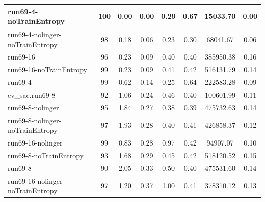 \begin{table}
\begin{longtable}{|l|c|c|c|c|c|c|c|}
run69-4-noTrainEntropy & 100 & {\cellcolor[HTML]{EBF2F0}} \color[HTML]{000000} 0.00 & {\cellcolor[HTML]{EBF2F0}} \color[HTML]{000000} 0.00 & {\cellcolor[HTML]{DFECE9}} \color[HTML]{000000} 0.29 & 0.67 & 15033.70 & 0.00 \\ \hline
run69-4-nolinger-noTrainEntropy & 98 & {\cellcolor[HTML]{EBF2F0}} \color[HTML]{000000} 0.18 & {\cellcolor[HTML]{EBF2F0}} \color[HTML]{000000} 0.06 & {\cellcolor[HTML]{EBF2F0}} \color[HTML]{000000} 0.23 & 0.30 & 68041.67 & 0.06 \\ \hline
run69-16 & 96 & {\cellcolor[HTML]{EBF2F0}} \color[HTML]{000000} 0.23 & {\cellcolor[HTML]{EBF2F0}} \color[HTML]{000000} 0.09 & {\cellcolor[HTML]{C9E2DC}} \color[HTML]{000000} 0.40 & 0.40 & 385950.38 & 0.16 \\ \hline
run69-16-noTrainEntropy & 99 & {\cellcolor[HTML]{EBF2F0}} \color[HTML]{000000} 0.23 & {\cellcolor[HTML]{EBF2F0}} \color[HTML]{000000} 0.09 & {\cellcolor[HTML]{C7E1DB}} \color[HTML]{000000} 0.41 & 0.42 & 516131.79 & 0.14 \\ \hline
run69-4 & 99 & {\cellcolor[HTML]{CBE3DD}} \color[HTML]{000000} 0.62 & {\cellcolor[HTML]{EBF2F0}} \color[HTML]{000000} 0.14 & {\cellcolor[HTML]{E6F0EE}} \color[HTML]{000000} 0.25 & 0.64 & 222583.28 & 0.09 \\ \hline
ev_sac.run69-8 & 92 & {\cellcolor[HTML]{A7D1C9}} \color[HTML]{000000} 1.06 & {\cellcolor[HTML]{D8E9E5}} \color[HTML]{000000} 0.24 & {\cellcolor[HTML]{BEDCD6}} \color[HTML]{000000} 0.46 & 0.40 & 100601.99 & 0.11 \\ \hline
run69-8-nolinger & 95 & {\cellcolor[HTML]{66B2A3}} \color[HTML]{F1F1F1} 1.84 & {\cellcolor[HTML]{BFDDD7}} \color[HTML]{000000} 0.27 & {\cellcolor[HTML]{CDE4DF}} \color[HTML]{000000} 0.38 & 0.39 & 475732.63 & 0.14 \\ \hline
run69-8-nolinger-noTrainEntropy & 97 & {\cellcolor[HTML]{5FAF9F}} \color[HTML]{F1F1F1} 1.93 & {\cellcolor[HTML]{B2D7CF}} \color[HTML]{000000} 0.28 & {\cellcolor[HTML]{CAE2DD}} \color[HTML]{000000} 0.40 & 0.41 & 426858.37 & 0.12 \\ \hline
run69-16-nolinger & 99 & {\cellcolor[HTML]{BADAD4}} \color[HTML]{000000} 0.83 & {\cellcolor[HTML]{ADD4CC}} \color[HTML]{000000} 0.28 & {\cellcolor[HTML]{5AAC9C}} \color[HTML]{F1F1F1} 0.97 & 0.42 & 94907.07 & 0.10 \\ \hline
run69-8-noTrainEntropy & 93 & {\cellcolor[HTML]{73B8AA}} \color[HTML]{000000} 1.68 & {\cellcolor[HTML]{A7D1C9}} \color[HTML]{000000} 0.29 & {\cellcolor[HTML]{C0DDD7}} \color[HTML]{000000} 0.45 & 0.42 & 518120.52 & 0.15 \\ \hline
run69-8 & 90 & {\cellcolor[HTML]{55AA99}} \color[HTML]{F1F1F1} 2.05 & {\cellcolor[HTML]{7ABCAF}} \color[HTML]{000000} 0.33 & {\cellcolor[HTML]{B6D8D1}} \color[HTML]{000000} 0.50 & 0.40 & 475531.60 & 0.14 \\ \hline
run69-16-nolinger-noTrainEntropy & 97 & {\cellcolor[HTML]{9ACBC1}} \color[HTML]{000000} 1.20 & {\cellcolor[HTML]{55AA99}} \color[HTML]{F1F1F1} 0.37 & {\cellcolor[HTML]{55AA99}} \color[HTML]{F1F1F1} 1.00 & 0.41 & 378310.12 & 0.13 \\ \hline



\end{longtable}
\end{table}
